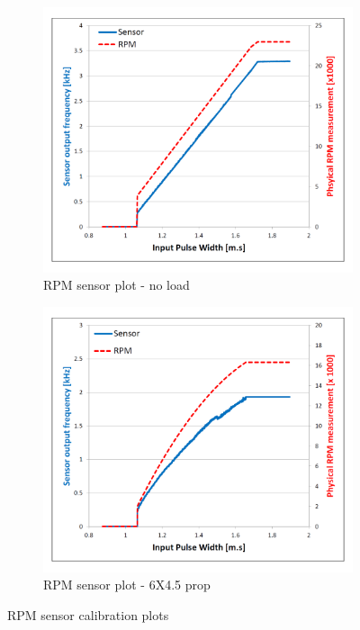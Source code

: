 \begin{figure}[htbp]
\begin{subfigure}{0.5\textwidth}
\centering
\includegraphics[width=\textwidth]{graphs/rpm-sensor-noload}
\caption{RPM sensor plot - no load}
\label{fig:rpm-sensor-noload}
\end{subfigure}
\begin{subfigure}{0.5\textwidth}
\centering
\includegraphics[width=\textwidth]{graphs/rpm-sensor-prop}
\caption{RPM sensor plot - 6X4.5 prop}
\label{fig:rpm-sensor-prop}
\end{subfigure}
\vspace{-4pt}
\caption{RPM sensor calibration plots}
\label{fig:rpm-sensor}
\vspace{-14pt}
\end{figure}
